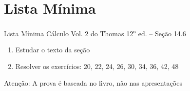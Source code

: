 \documentclass[fleqn,utf8,aspectratio=169,12pt,ignorenonframetext]{beamer}
\begin{document}


\section{Lista Mínima}

\begin{frame}{Lista Mínima}
  Cálculo Vol. 2 do Thomas 12\textsuperscript{a} ed. -- Seção 14.6
  \begin{enumerate}
    \item Estudar o texto da seção
    \item Resolver os exercícios: 20, 22, 24, 26, 30, 34, 36, 42, 48
  \end{enumerate}

  \vfill
  Atenção: A prova é baseada no livro, não nas apresentações
\end{frame}

\end{document}
